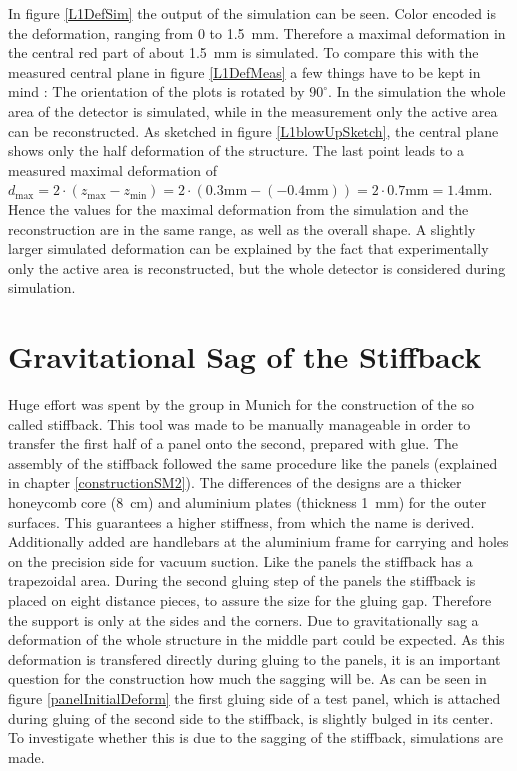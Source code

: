\documentclass[
a4paper,                                %
twoside,                                %
BCOR1.4cm,                      %
10pt,                           %
headings=normal,                %
headsepline,                    %
clearplainpage, %
final,                                  %
div=14,
parskip=full,
openright,
bibliography=toc
]{scrreprt}
\begin{document}
In figure \ref{L1DefSim} the output of the simulation can be seen. Color encoded is the deformation, ranging from 0 to \SI{1.5}{\mm}. Therefore a maximal deformation in the central red part of about \SI{1.5}{mm} is simulated. To compare this with the measured central plane in figure \ref{L1DefMeas} a few things have to be kept in mind : The orientation of the plots is rotated by $90^{\circ}$. In the simulation the whole area of the detector is simulated, while in the measurement only the active area can be reconstructed. As sketched in figure \ref{L1blowUpSketch}, the central plane shows only the half deformation of the structure. The last point leads to a measured maximal deformation of $d_{\mathrm{max}} = 2 \cdot ( z_{\mathrm{max}} - z_{\mathrm{min}} ) = 2 \cdot ( 0.3\mathrm{mm} - (-0.4\mathrm{mm}) ) = 2\cdot0.7\mathrm{mm} = 1.4\mathrm{mm}$. Hence the values for the maximal deformation from the simulation and the reconstruction are in the same range, as well as the overall shape. A slightly larger simulated deformation can be explained by the fact that experimentally only the active area is reconstructed, but the whole detector is considered during simulation.

\section{Gravitational Sag of the Stiffback}

Huge effort was spent by the group in Munich for the construction of the so called stiffback. This tool was made to be manually manageable in order to transfer the first half of a panel onto the second, prepared with glue. The assembly of the stiffback followed the same procedure like the panels (explained in chapter \ref{constructionSM2}). The differences of the designs are a thicker honeycomb core (\SI{8}{\cm}) and aluminium plates (thickness \SI{1}{mm}) for the outer surfaces. This guarantees a higher stiffness, from which the name is derived. Additionally added are handlebars at the aluminium frame for carrying and holes on the precision side for vacuum suction. Like the panels the stiffback has a trapezoidal area. During the second gluing step of the panels the stiffback is placed on eight distance pieces, to assure the size for the gluing gap. Therefore the support is only at the sides and the corners. Due to gravitationally sag a deformation of the whole structure in the middle part could be expected. As this deformation is transfered directly during gluing to the panels, it is an important question for the construction how much the sagging will be. As can be seen in figure \ref{panelInitialDeform} the first gluing side of a test panel, which is attached during gluing of the second side to the stiffback, is slightly bulged in its center. To investigate whether this is due to the sagging of the stiffback, simulations are made.
\end{document}
